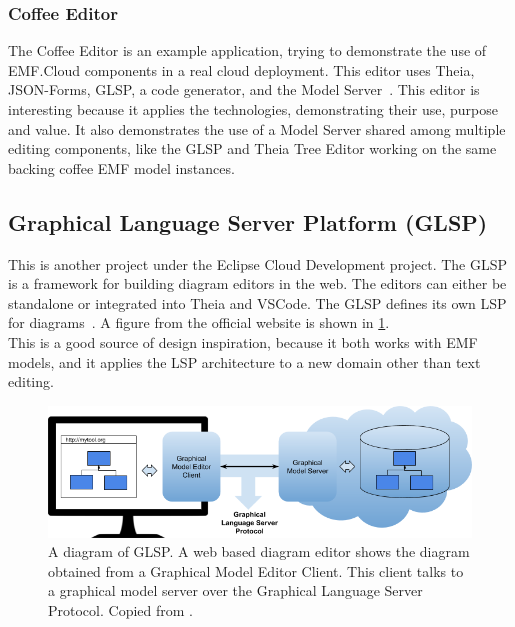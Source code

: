 \subsubsection{Coffee Editor}
The Coffee Editor is an example application, trying to demonstrate the use of EMF.Cloud components in a real \gls{cloud} deployment.
This editor uses \gls{Theia}, JSON-Forms, \acrshort{GLSP}, a code generator, and the Model Server~\cite{foundationEMFCloud}.
This editor is interesting because it applies the technologies, demonstrating their use, purpose and value.
It also demonstrates the use of a Model Server shared among multiple editing components, like the GLSP and Theia Tree Editor working on the same backing coffee \acrshort{EMF} model instances.

\subsection{Graphical Language Server Platform (GLSP)}\label{sec:glsp}

This is another project under the Eclipse Cloud Development project.
The \acrfull{GLSP} is a framework for building diagram editors in the web.
The editors can either be standalone or integrated into \gls{Theia} and \gls{VSCode}.
The \acrshort{GLSP} defines its own \acrfull{LSP} for diagrams~\cite{eclipsefoundationGLSP2020}.
A figure from the official website is shown in \cref{fig:glsp-overview}.\\

This is a good source of design inspiration, because it both works with \acrshort{EMF} models, and it applies the \acrlong{LSP} architecture to a new domain other than text editing.

\begin{figure}[htbp]  %
  \centering
  \includegraphics[width=\textwidth]{figures/pre-project/glsp-overview.png}
  \caption[GLSP Overview]{A diagram of GLSP. A web based diagram editor shows the diagram obtained from a Graphical Model Editor Client. This client talks to a graphical model server over the Graphical Language Server Protocol. Copied from \cite{eclipsefoundationGLSP2020}.}\label{fig:glsp-overview}
\end{figure}


